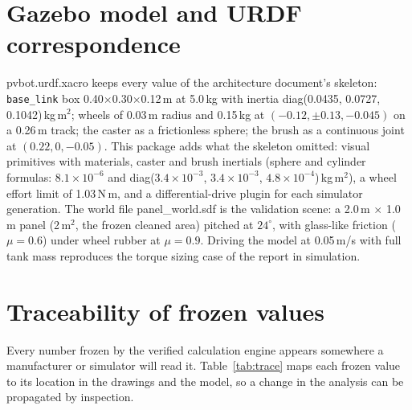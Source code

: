 \documentclass[11pt,a4paper]{article}
\newcommand{\fpath}[1]{{\ttfamily\small #1}}
\begin{document}
\section{Gazebo model and URDF correspondence}
\label{sec:ga}
\fpath{pvbot.urdf.xacro} keeps every value of the architecture document's
skeleton: \texttt{base\_link} box 0.40$\times$0.30$\times$0.12\,m at
5.0\,kg with inertia diag(0.0435, 0.0727, 0.1042)\,kg\,m$^2$; wheels of
0.03\,m radius and 0.15\,kg at $(-0.12, \pm 0.13, -0.045)$ on a 0.26\,m
track; the caster as a frictionless sphere; the brush as a continuous joint
at $(0.22, 0, -0.05)$. This package adds what the skeleton omitted: visual
primitives with materials, caster and brush inertials (sphere and cylinder
formulas: $8.1\times10^{-6}$ and diag($3.4\times10^{-3}$,
$3.4\times10^{-3}$, $4.8\times10^{-4}$)\,kg\,m$^2$), a wheel effort limit of
1.03\,N\,m, and a differential-drive plugin for each simulator generation.
The world file \fpath{panel\_world.sdf} is the validation scene: a 2.0\,m
$\times$ 1.0\,m panel (2\,m$^2$, the frozen cleaned area) pitched at
$24^\circ$, with glass-like friction ($\mu = 0.6$) under wheel rubber at
$\mu = 0.9$. Driving the model at 0.05\,m/s with full tank mass reproduces
the torque sizing case of the report in simulation.

\section{Traceability of frozen values}
Every number frozen by the verified calculation engine appears somewhere a
manufacturer or simulator will read it. Table~\ref{tab:trace} maps each
frozen value to its location in the drawings and the model, so a change in
the analysis can be propagated by inspection.
\end{document}
